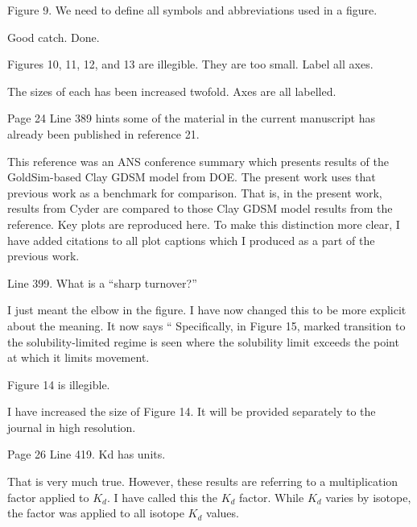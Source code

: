 \documentclass[answers,12pt]{exam}
\begin{document}
\begin{questions}
 

\question Figure 9. We need to define all symbols and abbreviations used in a figure.
\begin{solution}
Good catch. Done.
\end{solution}

 

\question Figures 10, 11, 12, and 13 are illegible. They are too small. Label all axes.
\begin{solution}
The sizes of each has been increased twofold. Axes are all labelled. 
\end{solution}

\question Page 24 Line 389 hints some of the material in the current manuscript has already been published in reference 21.
\begin{solution}
        This reference was an ANS conference summary which presents results of 
        the GoldSim-based Clay GDSM model from DOE. The present work uses that 
        previous work as a benchmark for comparison. That is, in the present 
        work, results from Cyder are compared to those Clay GDSM model results 
        from the reference. Key plots are reproduced here. To make this 
        distinction more clear, I have added citations to all plot captions 
        which I produced as a part of the previous work.
\end{solution}


\question Line 399. What is a ``sharp turnover?''
\begin{solution}
I just meant the elbow in the figure. I have now changed this to be more 
        explicit about the meaning. It now says `` Specifically, in Figure 15, 
        marked transition to the solubility-limited regime is seen where the 
        solubility limit exceeds the point at which it limits movement.  
\end{solution}

 

\question Figure 14 is illegible.
\begin{solution}
I have increased the size of Figure 14.
        It will be provided separately to the journal in high resolution. 
\end{solution}

 

\question Page 26 Line 419. Kd has units.
\begin{solution}
That is very much true. However, these results are referring to a 
        multiplication factor applied to $K_d$. I have called this the $K_d$ 
        factor. While $K_d$ varies by isotope, the factor was applied to all 
        isotope $K_d$ values. 
\end{solution}



\end{questions}
\end{document}
